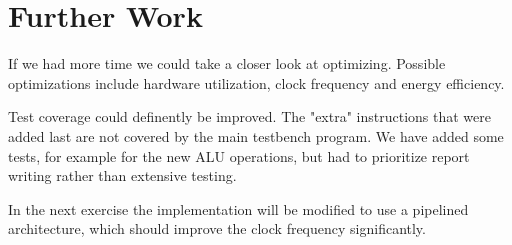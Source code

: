 \section{Further Work}
If we had more time we could take a closer look at optimizing.
Possible optimizations include hardware utilization, clock frequency and energy efficiency.

Test coverage could definently be improved.
The "extra" instructions that were added last are not covered by the main testbench program.
We have added some tests, for example for the new ALU operations,
but had to prioritize report writing rather than extensive testing.

In the next exercise the implementation will be modified to use a pipelined architecture,
which should improve the clock frequency significantly.
